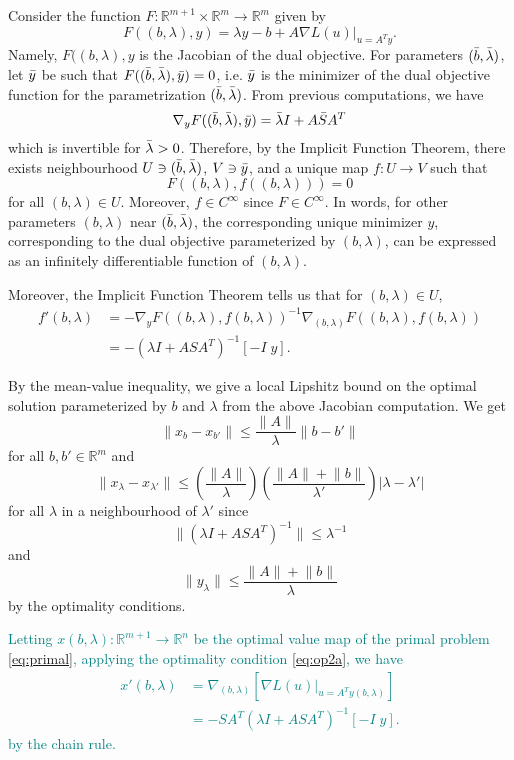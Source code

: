 \documentclass[10pt,a4paper]{article}
\numberwithin{equation}{section}
\theoremstyle{definition}
\def\rr{{\mathbb R}}
\begin{document}
Consider the function $F: \rr^{m+1} \times \rr^m \to \rr^m$ given by
\[
F((b,\lambda), y) = \lambda y - b + A \nabla L(u)|_{u = A^Ty}.
\]
Namely, $F((b,\lambda), y$ is the Jacobian of the dual objective. For parameters $(\Bar{b}, \Bar{\lambda})$, let $\Bar{y}$ be such that $F((\Bar{b},\Bar{\lambda}), \Bar{y}) = 0$, i.e. $\Bar{y}$ is the minimizer of the dual objective function for the parametrization $(\Bar{b}, \Bar{\lambda})$. From previous computations, we have
\[
\nabla_y F((\Bar{b},\Bar{\lambda}), \Bar{y}) = \Bar{\lambda}I + A \Bar{S} A^T
\]
which is invertible for $\Bar{\lambda} > 0$. Therefore, by the Implicit Function Theorem, there exists neighbourhood $U \ni (\Bar{b}, \Bar{\lambda})$, $V \ni \Bar{y}$, and a unique map $f:U \to V$ such that
\[
F((b,\lambda), f((b,\lambda))) = 0
\]
for all $(b,\lambda) \in U$. Moreover, $f \in C^\infty$ since $F \in C^\infty$. In words, for other parameters $(b,\lambda)$ near $(\Bar{b}, \Bar{\lambda})$, the corresponding unique minimizer $y$, corresponding to the dual objective parameterized by $(b,\lambda)$, can be expressed as an infinitely differentiable function of $(b,\lambda)$. 

Moreover, the Implicit Function Theorem \cite[Theorem 1B.1]{DontRock} tells us that for $(b, \lambda) \in U$,
\begin{align*}
f'(b,\lambda) &= - \nabla_y F((b,\lambda), f(b,\lambda))^{-1} \nabla_{(b,\lambda)} F((b,\lambda),  f(b,\lambda)) \\
&= - (\lambda I + A S A^T)^{-1}[-I \; y].
\end{align*}

By the mean-value inequality, we give a local Lipshitz bound on the optimal solution parameterized by $b$ and $\lambda$ from the above Jacobian computation. We get
\[
\lVert x_b - x_{b'}\lVert  \leq \frac{\lVert A \rVert}{\lambda} \rVert b - b' \rVert
\]
for all $b, b' \in \rr^m$ and 
\[
\lVert x_\lambda - x_{\lambda'}\lVert \leq \left(\frac{\lVert A \rVert}{\lambda}\right) \left(\frac{\lVert A \rVert + \lVert b \rVert}{\lambda'}\right) | \lambda - \lambda' |
\] for all $\lambda$ in a neighbourhood of $\lambda'$ since 
\[
\lVert (\lambda I + ASA^T)^{-1} \rVert \leq \lambda^{-1}
\]
and \[ 
\lVert y_\lambda \rVert \leq \frac{\lVert A \rVert + \lVert b \rVert}{\lambda} 
\]
by the optimality conditions.

\textcolor{teal}{Letting $x(b,\lambda): \rr^{m+1} \to \rr^n$ be the optimal value map of the primal problem \eqref{eq:primal}, applying the optimality condition \eqref{eq:op2a}, we have
\begin{align*}
x'(b, \lambda) &= \nabla_{(b, \lambda)}  [\nabla L(u)|_{u = A^Ty(b, \lambda)}] \\
&= - S A^T (\lambda I + A S A^T)^{-1}[-I \; y].
\end{align*}
by the chain rule.}
\end{document}
